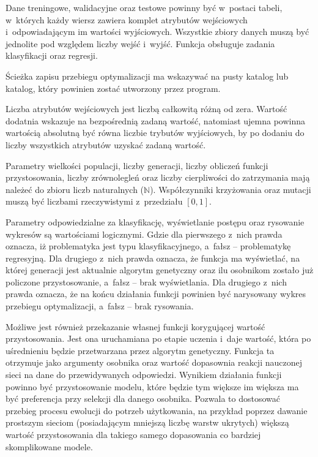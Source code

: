 Dane treningowe, walidacyjne oraz testowe powinny
być w~postaci tabeli, w~których każdy wiersz
zawiera komplet atrybutów wejściowych
i~odpowiadającym im wartości wyjściowych.
Wszystkie zbiory danych muszą być jednolite
pod względem liczby wejść i~wyjść.
Funkcja obsługuje zadania klasyfikacji oraz regresji.

Ścieżka zapisu przebiegu optymalizacji
ma wskazywać na pusty katalog lub katalog,
który powinien zostać utworzony przez program.

Liczba atrybutów wejściowych jest
liczbą całkowitą różną od zera.
Wartość dodatnia wskazuje
na bezpośrednią zadaną wartość,
natomiast ujemna powinna wartością absolutną
być równa liczbie trybutów wyjściowych,
by po dodaniu do liczby wszystkich
atrybutów uzyskać zadaną wartość.

Parametry wielkości populacji, liczby generacji,
liczby obliczeń funkcji przystosowania,
liczby zrównolegleń oraz liczby cierpliwości
do zatrzymania mają należeć
do zbioru liczb naturalnych ($\mathbb{N}$).
Współczynniki krzyżowania oraz mutacji
muszą być liczbami rzeczywistymi
z~przedziału $\left[0,1\right]$.

Parametry odpowiedzialne za
klasyfikację, wyświetlanie postępu
oraz rysowanie wykresów są wartościami logicznymi.
Gdzie dla pierwszego z~nich prawda oznacza,
iż problematyka jest typu klasyfikacyjnego,
a~fałsz -- problematykę regresyjną.
Dla drugiego z~nich prawda oznacza,
że funkcja ma wyświetlać,
na której generacji jest aktualnie
algorytm genetyczny oraz ilu osobnikom
zostało już policzone przystosowanie,
a~fałsz -- brak wyświetlania.
Dla drugiego z~nich prawda oznacza,
że na końcu działania funkcji powinien być
narysowany wykres przebiegu optymalizacji,
a~fałsz -- brak rysowania.

Możliwe jest również przekazanie własnej
funkcji korygującej wartość przystosowania.
Jest ona uruchamiana po etapie uczenia i~daje wartość,
która po uśrednieniu będzie przetwarzana
przez algorytm genetyczny.
Funkcja ta otrzymuje jako argumenty osobnika
oraz wartość dopasownia reakcji nauczonej sieci
na dane do przewidywanych odpowiedzi.
Wynikiem działania funkcji powinno
być przystosowanie modelu,
które będzie tym większe im większa ma być
preferencja przy selekcji dla danego osobnika.
Pozwala to dostosować przebieg
procesu ewolucji do potrzeb użytkowania,
na przykład poprzez dawanie prostszym sieciom
(posiadającym mniejszą liczbę warstw ukrytych)
większą wartość przystosowania dla takiego samego
dopasowania co bardziej skomplikowane modele.

